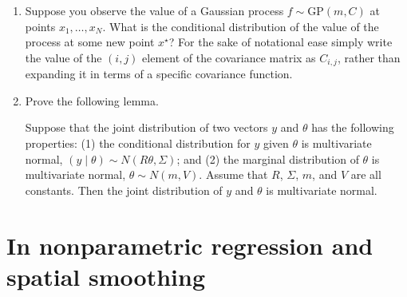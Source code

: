 \documentclass{homework}
\newcommand{\1}{\mathbf{1}}
\begin{document}
\begin{enumerate}[label=(\Alph*)]
\item Suppose you observe the value of a Gaussian process $f \sim \mbox{GP}(m,C)$ at points $x_1, \ldots, x_N$.  What is the conditional distribution of the value of the process at some new point $x^{\star}$?  For the sake of notational ease simply write the value of the $(i,j)$ element of the covariance matrix as $C_{i,j}$, rather than expanding it in terms of a specific covariance function.

\item Prove the following lemma.

Suppose that the joint distribution of two vectors $y$ and $\theta$ has the following properties: (1) the conditional distribution for $y$ given $\theta$ is multivariate normal, $(y \mid \theta) \sim N(R\theta, \Sigma)$; and (2) the marginal distribution of $\theta$ is multivariate normal, $\theta \sim N(m,V)$.  Assume that $R$, $\Sigma$, $m$, and $V$ are all constants.  Then the joint distribution of $y$ and $\theta$ is multivariate normal.

\end{enumerate}


\section{In nonparametric regression and spatial smoothing}
\end{document}
